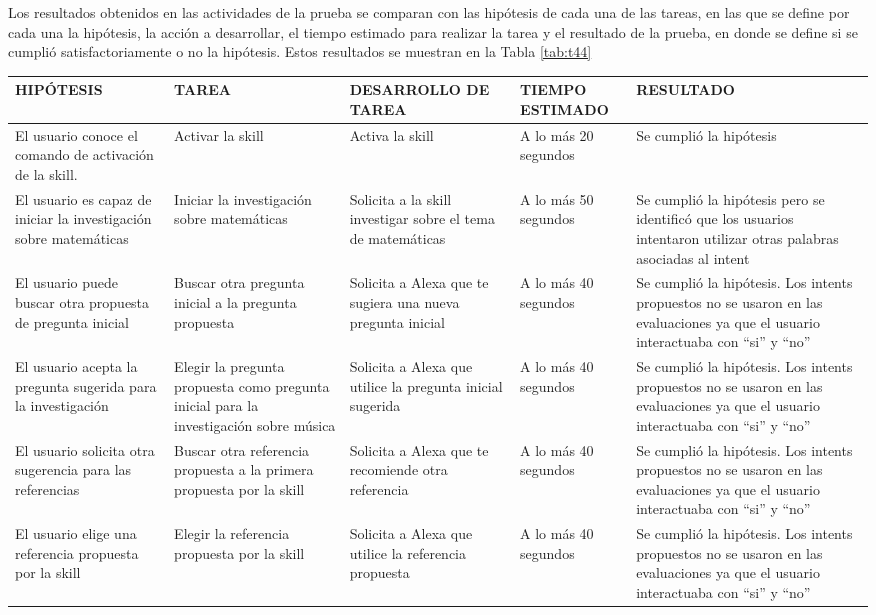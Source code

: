 Los resultados obtenidos en las actividades de la prueba se comparan con las hipótesis de cada una de las tareas, en las que se define por cada una la hipótesis, la acción a desarrollar, el tiempo estimado para realizar la tarea y el resultado de la prueba, en donde se define si se cumplió satisfactoriamente o no la hipótesis. Estos resultados se muestran en la Tabla \ref{tab:t44}

\begin{table}[H]
  \begin{center}
    \begin{tabular}{ | p{3cm} | p{3cm} | p{3cm} | p{2cm} | p{4cm} | }
      \hline
      HIPÓTESIS & TAREA & DESARROLLO DE TAREA & TIEMPO ESTIMADO & RESULTADO \\ \hline
      El usuario conoce el comando de activación de la skill. & Activar la skill & Activa la skill & A lo más 20 segundos & Se cumplió la hipótesis \\ \hline
      El usuario es capaz de iniciar la investigación sobre matemáticas & Iniciar la investigación sobre matemáticas & Solicita a la skill investigar sobre el tema de matemáticas & A lo más 50 segundos & Se cumplió la hipótesis pero se identificó que los usuarios intentaron utilizar otras palabras asociadas al intent \\ \hline
      El usuario puede buscar otra propuesta de pregunta inicial & Buscar otra pregunta inicial a la pregunta propuesta & Solicita a Alexa que te sugiera una nueva pregunta inicial & A lo más 40 segundos & Se cumplió la hipótesis. Los intents propuestos no se usaron en las evaluaciones ya que el usuario interactuaba con “si” y “no” \\ \hline
      El usuario acepta la pregunta sugerida para la investigación & Elegir la pregunta propuesta como pregunta inicial para la investigación sobre música & Solicita a Alexa que utilice la pregunta inicial sugerida & A lo más 40 segundos & Se cumplió la hipótesis. Los intents propuestos no se usaron en las evaluaciones ya que el usuario interactuaba con “si” y “no” \\ \hline
      El usuario solicita otra sugerencia para las referencias & Buscar otra referencia propuesta a la primera propuesta por la skill & Solicita a Alexa que te recomiende otra referencia & A lo más 40 segundos & Se cumplió la hipótesis. Los intents propuestos no se usaron en las evaluaciones ya que el usuario interactuaba con “si” y “no” \\ \hline
      El usuario elige una referencia propuesta por la skill & Elegir la referencia propuesta por la skill & Solicita a Alexa que utilice la referencia propuesta & A lo más 40 segundos & Se cumplió la hipótesis. Los intents propuestos no se usaron en las evaluaciones ya que el usuario interactuaba con “si” y “no” \\ \hline
    \end{tabular}
  \end{center}
\end{table}

